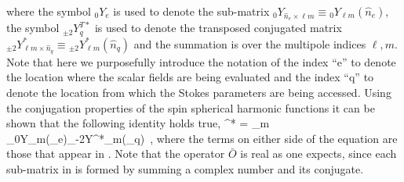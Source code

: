\eeqrys
%
where the symbol ${}_{0}Y_e$ is used to denote the sub-matrix ${}_{0}Y_{\hat{n}_e \times \ell m} \equiv {}_{0}Y_{\ell m}(\hat{n}_e)$, the symbol ${}_{\pm 2}Y^{T*}_q$ is used to denote the transposed conjugated matrix ${}_{\pm 2}Y^*_{\ell m \times \hat{n}_q} \equiv {}_{\pm 2}Y^*_{\ell m}(\hat{n}_q)$ and the summation is over the multipole indices $\ell,m$. Note that here we purposefully introduce the notation of the index ``e'' to denote the location where the scalar fields are being evaluated and the index ``q'' to denote the location from which  the Stokes parameters are being accessed. Using the conjugation properties of the spin spherical harmonic functions it can be shown that the following identity holds true,
%
\beq
 ^* = \sum_{\ell m} {}_{0}Y_{\ell m}(_e){}_{-2}Y^*_{\ell m}(_q) \,,
 \eeq
where the terms on either side of the equation are those that appear in . Note that the operator $\bar{O}$ is real as one expects, since each sub-matrix in  is formed by summing a complex number and its conjugate. 

